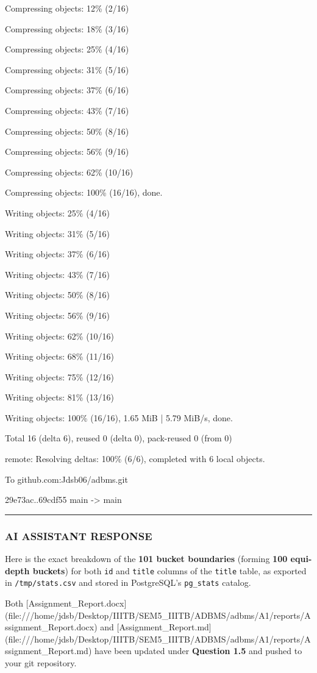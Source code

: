 \documentclass[11pt,a4paper]{article}
\begin{document}
{Compressing objects:  12\% (2/16)

Compressing objects:  18\% (3/16)

Compressing objects:  25\% (4/16)

Compressing objects:  31\% (5/16)

Compressing objects:  37\% (6/16)

Compressing objects:  43\% (7/16)

Compressing objects:  50\% (8/16)

Compressing objects:  56\% (9/16)

Compressing objects:  62\% (10/16)

Compressing objects: 100\% (16/16), done.

Writing objects:  25\% (4/16)

Writing objects:  31\% (5/16)

Writing objects:  37\% (6/16)

Writing objects:  43\% (7/16)

Writing objects:  50\% (8/16)

Writing objects:  56\% (9/16)

Writing objects:  62\% (10/16)

Writing objects:  68\% (11/16)

Writing objects:  75\% (12/16)

Writing objects:  81\% (13/16)

Writing objects: 100\% (16/16), 1.65 MiB | 5.79 MiB/s, done.

Total 16 (delta 6), reused 0 (delta 0), pack-reused 0 (from 0)

remote: Resolving deltas: 100\% (6/6), completed with 6 local objects.

To github.com:Jdsb06/adbms.git

29e73ac..69cdf55  main -> main


\hrule

\subsubsection{AI ASSISTANT RESPONSE}

Here is the exact breakdown of the \textbf{101 bucket boundaries} (forming \textbf{100 equi-depth buckets}) for both \texttt{id} and \texttt{title} columns of the \texttt{title} table, as exported in \texttt{/tmp/stats.csv} and stored in PostgreSQL's \texttt{pg\_stats} catalog.


Both [Assignment\_Report.docx](file:///home/jdsb/Desktop/IIITB/SEM5\_IIITB/ADBMS/adbms/A1/reports/Assignment\_Report.docx) and [Assignment\_Report.md](file:///home/jdsb/Desktop/IIITB/SEM5\_IIITB/ADBMS/adbms/A1/reports/Assignment\_Report.md) have been updated under \textbf{Question 1.5} and pushed to your git repository.


}
\end{document}
